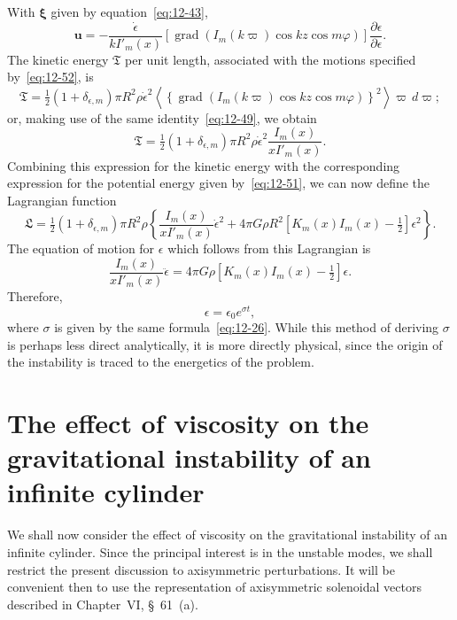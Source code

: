 With $\boldsymbol\xi$ given by equation~\eqref{eq:12-43},
\begin{equation}
\label{eq:12-53}
\mathbf{u} = -\frac{\dot{\epsilon}}{k I'_m(x)}[\operatorname{grad}(I_m(k\varpi) \cos kz \cos m\varphi)] \frac{\partial \epsilon}{\partial \epsilon}.
\end{equation}
The kinetic energy $\mathfrak{T}$ per unit length, associated with the motions specified by~\eqref{eq:12-52}, is
\begin{equation}
\label{eq:12-54}
\mathfrak{T} = \tfrac{1}{2}(1+\delta_{\epsilon,m})\pi R^2 \rho \dot{\epsilon}^2 \left\langle \left\{ \operatorname{grad}(I_m(k\varpi) \cos kz \cos m\varphi) \right\}^2 \right\rangle \varpi\, d\varpi;
\end{equation}
or, making use of the same identity~\eqref{eq:12-49}, we obtain
\begin{equation}
\label{eq:12-55}
\mathfrak{T} = \tfrac{1}{2}(1+\delta_{\epsilon,m})\pi R^2 \rho \dot{\epsilon}^2 \frac{I_m(x)}{x I'_m(x)}.
\end{equation}
Combining this expression for the kinetic energy with the corresponding expression for the potential energy given by~\eqref{eq:12-51}, we can now define the Lagrangian function
\begin{equation}
\label{eq:12-56}
\mathfrak{L} = \tfrac{1}{2}(1+\delta_{\epsilon,m})\pi R^2 \rho \left\{ \frac{I_m(x)}{x I'_m(x)} \dot{\epsilon}^2 + 4\pi G\rho R^2 [K_m(x) I_m(x) - \tfrac{1}{2}] \epsilon^2 \right\}.
\end{equation}
The equation of motion for $\epsilon$ which follows from this Lagrangian is
\begin{equation}
\label{eq:12-57}
\frac{I_m(x)}{x I'_m(x)} \ddot{\epsilon} = 4\pi G\rho \left[K_m(x) I_m(x) - \tfrac{1}{2}\right] \epsilon.
\end{equation}
Therefore,
\begin{equation}
\label{eq:12-58}
\epsilon = \epsilon_0 e^{\sigma t},
\end{equation}
where $\sigma$ is given by the same formula~\eqref{eq:12-26}. While this method of deriving $\sigma$ is perhaps less direct analytically, it is more directly physical, since the origin of the instability is traced to the energetics of the problem.

\section{The effect of viscosity on the gravitational instability of an infinite cylinder}\label{sec:109}
We shall now consider the effect of viscosity on the gravitational instability of an infinite cylinder. Since the principal interest is in the unstable modes, we shall restrict the present discussion to axisymmetric perturbations. It will be convenient then to use the representation of axisymmetric solenoidal vectors described in Chapter~VI, \S~61~(a).

